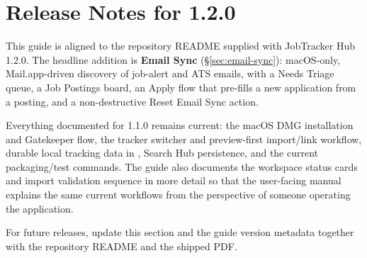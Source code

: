 \documentclass[11pt]{article}
\newcommand{\file}[1]{\texttt{\detokenize{#1}}}
\begin{document}
\section{Release Notes for 1.2.0}

This guide is aligned to the repository README supplied with JobTracker Hub 1.2.0. The headline addition is \textbf{Email Sync} (\S\ref{sec:email-sync}): macOS-only, Mail.app-driven discovery of job-alert and ATS emails, with a Needs Triage queue, a Job Postings board, an Apply flow that pre-fills a new application from a posting, and a non-destructive Reset Email Sync action.

Everything documented for 1.1.0 remains current: the macOS DMG installation and Gatekeeper flow, the tracker switcher and preview-first import/link workflow, durable local tracking data in \file{overrides.db}, Search Hub persistence, and the current packaging/test commands. The guide also documents the workspace status cards and import validation sequence in more detail so that the user-facing manual explains the same current workflows from the perspective of someone operating the application.

For future releases, update this section and the guide version metadata together with the repository README and the shipped PDF.
\end{document}
